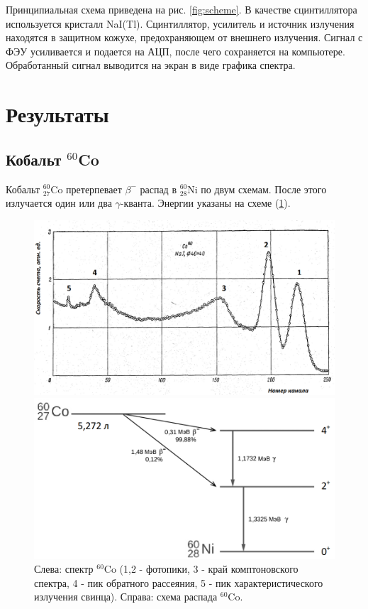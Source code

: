 \documentclass[12pt,a4paper]{article}
\begin{document}
	Принципиальная схема приведена на рис. \ref{fig:scheme}. В качестве сцинтиллятора используется кристалл NaI(Tl). Сцинтиллятор, усилитель и источник излучения находятся в защитном кожухе, предохраняющем от внешнего излучения. Сигнал с ФЭУ усиливается и подается на АЦП, после чего сохраняется на компьютере. Обработанный сигнал выводится на экран в виде графика спектра.
		
	\section*{Результаты}
	
	\subsection*{Кобальт $^{60}$Co}

	Кобальт $^{60}_{27}$Co претерпевает $\beta^{-}$ распад в $^{60}_{28}$Ni по двум схемам. После этого излучается один или два $\gamma$-кванта. Энергии указаны на схеме (\ref{fig:co_scheme}).

	\begin{figure}[H]
		\centering
		\begin{minipage}{0.55\textwidth}
				\centering
				\includegraphics[width=0.9\linewidth]{res/co_spectre.png}
			\end{minipage}%
		\begin{minipage}{0.45\textwidth}
				\centering
				\includegraphics[width=1.0\linewidth]{res/co_levels.png}
			\end{minipage}
		\caption{\centering
				Слева: спектр $^{60}$Co (1,2 - фотопики, 3 - край комптоновского спектра, 4 - пик обратного рассеяния, 5 - пик характеристического излучения свинца). \newline
				Справа: схема распада $^{60}$Co.}
		\label{fig:co_scheme}
	\end{figure}
	
\end{document}

